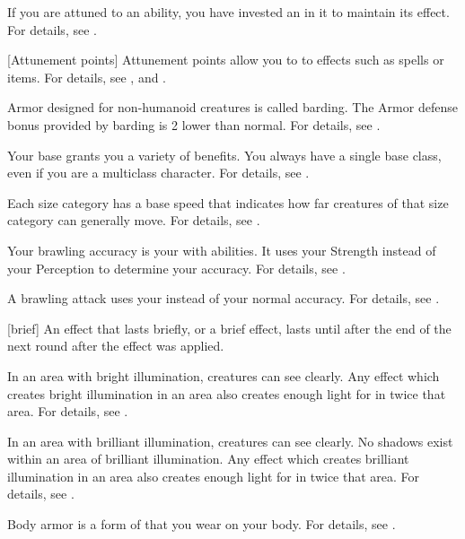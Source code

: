  If you are attuned to an ability, you have invested an  in it to maintain its effect.
For details, see .

[Attunement points] Attunement points allow you to  to effects such as spells or items.
For details, see , and .

 Armor designed for non-humanoid creatures is called barding.
The Armor defense bonus provided by barding is 2 lower than normal.
For details, see .

 Your base  grants you a variety of benefits.
You always have a single base class, even if you are a multiclass character.
For details, see .

 Each size category has a base speed that indicates how far creatures of that size category can generally move.
For details, see .

 Your brawling accuracy is your  with \atBrawling abilities.
It uses your Strength instead of your Perception to determine your accuracy.
For details, see .

 A brawling attack uses your  instead of your normal accuracy.
For details, see .

[brief] An effect that lasts briefly, or a brief effect, lasts until after the end of the next round after the effect was applied.

 In an area with bright illumination, creatures can see clearly.
Any effect which creates bright illumination in an area also creates enough light for  in twice that area.
For details, see .

 In an area with brilliant illumination, creatures can see clearly.
No shadows exist within an area of brilliant illumination.
Any effect which creates brilliant illumination in an area also creates enough light for  in twice that area.
For details, see .

 Body armor is a form of  that you wear on your body.
For details, see .

